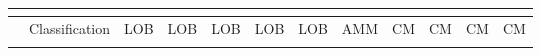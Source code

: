 



\begin{table*}[t]

\centering
\begin{tabular}{|c|c|c|c|c|c|c|c|c|c|c|c|c|}

\multicolumn{1}{c}{} &
\multicolumn{1}{c}{} &

\multicolumn{1}{c}{} &
\headrow{Centralized Exchange} &
\headrow{DEX w/ Off-chain Order Book} & 
\headrow{DEX w/ Roll-up} & 
\headrow{On-chain Continuous Market} &
\headrow{Dark On-chain Order Book}&
\headrow{On-chain Automated Market Making} & 
\headrow{On-chain Call Market (\cm)} & 
\headrow{On-chain Call Market w/ Price Improvement}&
\headrow{On-chain Call Market w/ Roll-up (\cm variant)} &
\headrow{Dark On-chain Call Market} 
\\

\hline
	     
	     
	     
	     & \multicolumn{2}{c|}{Classification}             																											&\multicolumn{1}{c|}{LOB}		&\multicolumn{1}{c|}{LOB}		&\multicolumn{1}{c|}{LOB}		&\multicolumn{1}{c|}{LOB}		&\multicolumn{1}{c|}{LOB}		&\multicolumn{1}{c|}{AMM}		&\multicolumn{1}{c|}{CM}		&\multicolumn{1}{c|}{CM}	&\multicolumn{1}{c|}{CM}								  										&\multicolumn{1}{c|}{CM}	 \\ \hhline{-------------}                 



\end{tabular}
\end{table*}
